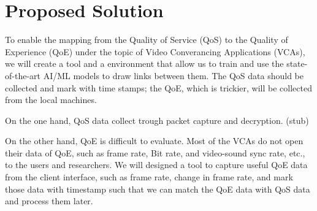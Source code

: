 \section{Proposed Solution}\label{proposedsolution}
    To enable the mapping from the Quality of Service (QoS) to the Quality of Experience (QoE) under the topic of Video Converancing Applications (VCAs), we will create a tool and a environment that allow us to train and use the state-of-the-art AI/ML models to draw links between them. The QoS data should be collected and mark with time stamps; the QoE, which is trickier, will be collected from the local machines. 

    On the one hand, QoS data collect trough packet capture and decryption. (stub)

    On the other hand, QoE is difficult to evaluate. Most of the VCAs do not open their data of QoE, such as frame rate, Bit rate, and video-sound sync rate, etc., to the users and researchers. We will designed a tool to capture useful QoE data from the client interface, such as frame rate, change in frame rate, and mark those data with timestamp such that we can match the QoE data with QoS data and process them later.  
